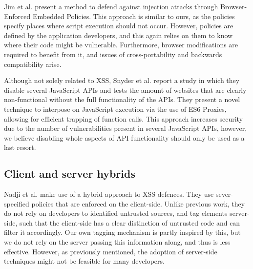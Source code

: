  Jim et al. \cite{Jim:2007:DSI:1242572.1242654} present a method to defend against injection attacks through Browser-Enforced Embedded Policies. This approach is similar to ours, as the policies specify places where script execution should not occur. However, policies are defined by the application developers, and this again relies on them to know where their code might be vulnerable. Furthermore, browser modifications are required to benefit from it, and issues of cross-portability and backwards compatibility arise.

Although not solely related to XSS, Snyder et al. \cite{Snyder:2017:MWD:3133956.3133966} report a study in which they disable several JavaScript APIs and tests the amount of websites that are clearly non-functional without the full functionality of the APIs. They present a novel technique to interpose on JavaScript execution via the use of ES6 Proxies, allowing for efficient trapping of function calls. This approach increases security due to the number of vulnerabilities present in several JavaScript APIs, however, we believe disabling whole aspects of API functionality should only be used as a last resort.

\subsection{Client and server hybrids}
Nadji et al. \cite{Nadji:2009} make use of a hybrid approach to XSS defences. They use sever-specified policies that are enforced on the client-side. Unlike previous work, they do not rely on developers to identified untrusted sources, and tag elements server-side, such that the client-side has a clear distinction of untrusted code and can filter it accordingly. Our own tagging mechanism is partly inspired by this, but we do not rely on the server passing this information along, and thus is less effective. However, as previously mentioned, the adoption of server-side techniques might not be feasible for many developers.